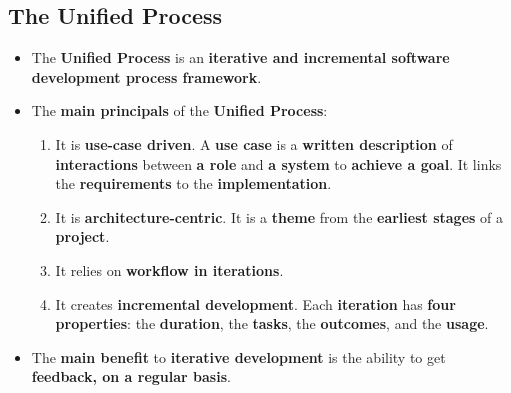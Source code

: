 \documentclass[16pt]{article}
\begin{document}
    \subsection*{The Unified Process}
    \begin{itemize}
        \item The \textbf{Unified Process} is an \textbf{iterative and incremental software development process framework}.
        \item The \textbf{main principals} of the \textbf{Unified Process}:
        \begin{enumerate}
            \item It is \textbf{use-case driven}. A \textbf{use case} is a \textbf{written description} of \textbf{interactions} between \textbf{a role} and \textbf{a system} to \textbf{achieve a goal}. It links the \textbf{requirements} to the \textbf{implementation}.
            \item It is \textbf{architecture-centric}. It is a \textbf{theme} from the \textbf{earliest stages} of a \textbf{project}.
            \item It relies on \textbf{workflow in iterations}. 
            \item It creates \textbf{incremental development}. Each \textbf{iteration} has \textbf{four properties}: the \textbf{duration}, the \textbf{tasks}, the \textbf{outcomes}, and the \textbf{usage}.
        \end{enumerate}
        \item The \textbf{main benefit} to \textbf{iterative development} is the ability to get \textbf{feedback, on a regular basis}.
    \end{itemize}

    \section*{}
\end{document}
